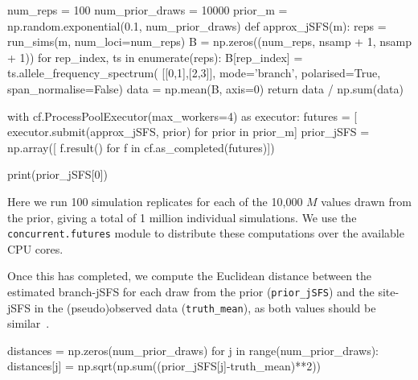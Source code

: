 \documentclass[graybox]{svmult}
\begin{document}
\begin{pythoncode}
num_reps = 100
num_prior_draws = 10000
prior_m = np.random.exponential(0.1, num_prior_draws)
def approx_jSFS(m):
    reps = run_sims(m, num_loci=num_reps)
    B = np.zeros((num_reps, nsamp + 1, nsamp + 1))
    for rep_index, ts in enumerate(reps):
        B[rep_index] = ts.allele_frequency_spectrum(
            [[0,1],[2,3]], mode='branch',
            polarised=True, span_normalise=False)
    data = np.mean(B, axis=0)
    return data / np.sum(data)

with cf.ProcessPoolExecutor(max_workers=4) as executor:
    futures = [
        executor.submit(approx_jSFS, prior) for prior in prior_m]
    prior_jSFS = np.array([
        f.result() for f in cf.as_completed(futures)])

print(prior_jSFS[0])
\end{pythoncode}

Here we run 100 simulation replicates for each of the 10,000
\(M\) values drawn from the prior, giving a total of 1 million individual simulations.
We use the \texttt{concurrent.futures} module to distribute these
computations over the available CPU cores.

Once this has completed, we compute the Euclidean distance between the estimated branch-jSFS for each
draw from the prior (\texttt{prior\_jSFS}) and the site-jSFS in the (pseudo)observed
data (\texttt{truth\_mean}), as both values should be
similar~\citep{ralph2020efficiently}.
\begin{pythoncode}
distances = np.zeros(num_prior_draws)
for j in range(num_prior_draws):
    distances[j] = np.sqrt(np.sum((prior_jSFS[j]-truth_mean)**2))
\end{pythoncode}
\end{document}
